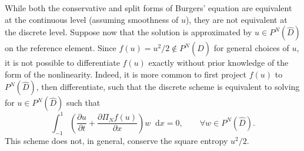 \documentclass[preprint,10pt]{elsarticle}
\theoremstyle{definition}
\theoremstyle{lemma}
\theoremstyle{theorem}
\theoremstyle{assumption}
\newcommand{\pd}[2]{\frac{\partial#1}{\partial#2}}
\newcommand{\LRp}[1]{\left( #1 \right)}
\newcommand*\diff[1]{\mathop{}\!{\mathrm{d}#1}}
\begin{document}
While both the conservative and split forms of Burgers' equation are equivalent at the continuous level (assuming smoothness of $u$), they are not equivalent at the discrete level.  Suppose now that the solution is approximated by $u \in P^N\LRp{\widehat{D}}$ on the reference element.  Since $f(u) = u^2/2 \not\in P^N\LRp{\widehat{D}}$ for general choices of $u$, it is not possible to differentiate $f(u)$ exactly without prior knowledge of the form of the nonlinearity.  Indeed, it is more common to first project $f(u)$ to $P^N\LRp{\widehat{D}}$, then differentiate, such that the discrete scheme is equivalent to solving for $u \in P^N\LRp{\widehat{D}}$ such that
\[
\int_{-1}^1 \LRp{\pd{u}{t} + \pd{\Pi_N f(u)}{x}}w \diff{x}  
=0, \qquad \forall w \in P^N\LRp{\widehat{D}}.  
\]
This scheme does not, in general, conserve the square entropy $u^2/2$.  %
\end{document}
